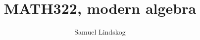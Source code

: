 \documentclass{article}
\begin{document}
\theoremstyle{definition}\newtheorem{defi}{Definition}[section]
\theoremstyle{definition}\newtheorem{axiom}{Axiom}[section]
\theoremstyle{definition}\newtheorem{thm}{Theorem}[section]
\theoremstyle{definition}\newtheorem{cor}{Corollary}[section]
\theoremstyle{definition}\newtheorem{lem}{Lemma}[section]
\theoremstyle{remark}\newtheorem*{notat}{Notation}
\theoremstyle{remark}\newtheorem*{rema}{Remark}
\theoremstyle{definition}\newtheorem{problem}{Problem}
\newenvironment{prob}[1]{\protect\setcounter{problem}{#1}\addtocounter{problem}{-1}\begin{problem}}{\end{problem}}

\DeclarePairedDelimiter{\ceil}{\lceil}{\rceil}
\DeclarePairedDelimiter{\floor}{\lfloor}{\rfloor}

\title{MATH322, modern algebra}
\author{Samuel Lindskog}
\maketitle
\end{document}
